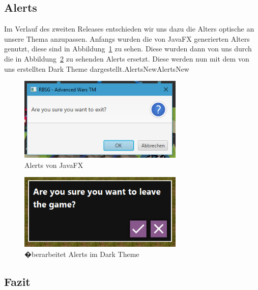 \documentclass[12pt, titlepage]{scrartcl}
\newcommand{\Abb}[1]{%
	Abbildung\ \ref{#1}%
}
\begin{document}
			\subsection{Alerts}
			Im Verlauf des zweiten Releases entschieden wir uns dazu die Alters optische an unsere Thema anzupassen. Anfangs wurden die von JavaFX generierten Alters genutzt, diese sind in \Abb{AlertsOld} zu sehen. Diese wurden dann von uns durch die in \Abb{AlertsNew} zu sehenden Alerts ersetzt. Diese werden nun mit dem von uns erstellten Dark Theme dargestellt.AlertsNewAlertsNew
			\begin{figure}[H] 
				\centering
				\includegraphics[width=0.7\textwidth]{Alert_Old.PNG}
				\caption{Alerts von JavaFX}
				\label{AlertsOld}
			\end{figure}
		
			\begin{figure}[H] 
				\centering
				\includegraphics[width=0.7\textwidth]{Alerts_New_Style.PNG}
				\caption{�berarbeitet Alerts im Dark Theme}
				\label{AlertsNew}
			\end{figure}
		
			\subsection{Fazit} 
		
	\newpage
	\appendix
	\listoffigures
	\listoftables
\end{document}
